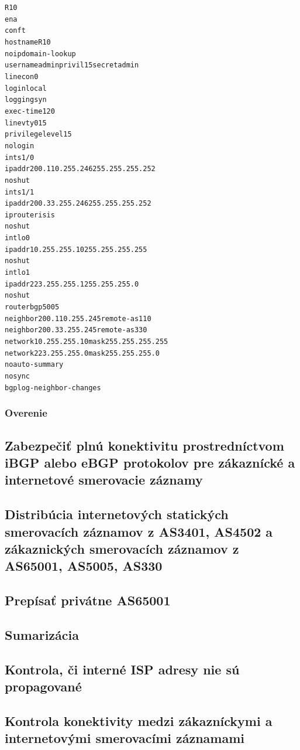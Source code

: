 \documentclass[12pt,twoside,a4paper]{report}
\begin{document}
{\begin{small}
\begin{alltt}
R10
ena
conf t
hostname R10
no ip domain-lookup
username admin privil 15 secret admin
line con 0
  login local
  logging syn
  exec-time 120
line vty 0 15
  privilege level 15
  no login
int s1/0
  ip addr 200.110.255.246 255.255.255.252
  no shut
int s1/1
  ip addr 200.33.255.246 255.255.255.252
  ip router isis
  no shut
int lo0
  ip addr 10.255.255.10 255.255.255.255
  no shut
int lo1
  ip addr 223.255.255.1 255.255.255.0
  no shut
router bgp 5005
  neighbor 200.110.255.245 remote-as 110
  neighbor 200.33.255.245 remote-as 330
  network 10.255.255.10 mask 255.255.255.255
  network 223.255.255.0 mask 255.255.255.0
  no auto-summary
  no sync
  bgp log-neighbor-changes

\end{alltt}
\end{small}
}

\subsubsection{Overenie}



\subsection{Zabezpečiť plnú konektivitu prostredníctvom iBGP alebo eBGP protokolov pre zákaznícké a internetové smerovacie záznamy}
\subsection{Distribúcia internetových statických smerovacích záznamov z AS3401, AS4502 a zákaznických smerovacích záznamov z AS65001, AS5005, AS330}
\subsection{Prepísať privátne AS65001}
\subsection{Sumarizácia}
\subsection{Kontrola, či interné ISP adresy nie sú propagované}
\subsection{Kontrola konektivity medzi zákazníckymi a internetovými smerovacími záznamami}
\end{document}
